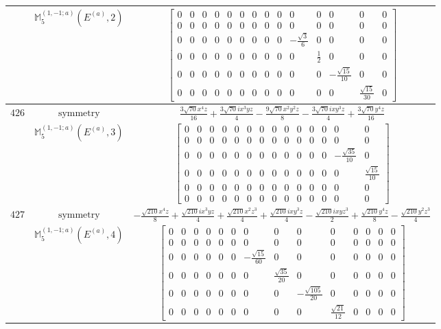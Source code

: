 \documentclass[fleqn,8pt,landscape]{jsarticle}
\begin{document}
\begin{longtable}{ccc}
$  $ & $ \mathbb{M}_{5}^{(1,-1;a)}(E^{(a)},2) $ & $ \begin{bmatrix} 0 & 0 & 0 & 0 & 0 & 0 & 0 & 0 & 0 & 0 & 0 & 0 & 0 & 0 \\ 0 & 0 & 0 & 0 & 0 & 0 & 0 & 0 & 0 & 0 & 0 & 0 & 0 & 0 \\ 0 & 0 & 0 & 0 & 0 & 0 & 0 & 0 & 0 & - \frac{\sqrt{3}}{6} & 0 & 0 & 0 & 0 \\ 0 & 0 & 0 & 0 & 0 & 0 & 0 & 0 & 0 & 0 & \frac{1}{2} & 0 & 0 & 0 \\ 0 & 0 & 0 & 0 & 0 & 0 & 0 & 0 & 0 & 0 & 0 & - \frac{\sqrt{15}}{10} & 0 & 0 \\ 0 & 0 & 0 & 0 & 0 & 0 & 0 & 0 & 0 & 0 & 0 & 0 & \frac{\sqrt{15}}{30} & 0 \end{bmatrix} $ \\ \hline
$ 426 $ & $ \text{symmetry} $ & $ \frac{3 \sqrt{70} x^{4} z}{16} + \frac{3 \sqrt{70} i x^{3} y z}{4} - \frac{9 \sqrt{70} x^{2} y^{2} z}{8} - \frac{3 \sqrt{70} i x y^{3} z}{4} + \frac{3 \sqrt{70} y^{4} z}{16} $ \\
$  $ & $ \mathbb{M}_{5}^{(1,-1;a)}(E^{(a)},3) $ & $ \begin{bmatrix} 0 & 0 & 0 & 0 & 0 & 0 & 0 & 0 & 0 & 0 & 0 & 0 & 0 & 0 \\ 0 & 0 & 0 & 0 & 0 & 0 & 0 & 0 & 0 & 0 & 0 & 0 & 0 & 0 \\ 0 & 0 & 0 & 0 & 0 & 0 & 0 & 0 & 0 & 0 & 0 & 0 & - \frac{\sqrt{35}}{10} & 0 \\ 0 & 0 & 0 & 0 & 0 & 0 & 0 & 0 & 0 & 0 & 0 & 0 & 0 & \frac{\sqrt{15}}{10} \\ 0 & 0 & 0 & 0 & 0 & 0 & 0 & 0 & 0 & 0 & 0 & 0 & 0 & 0 \\ 0 & 0 & 0 & 0 & 0 & 0 & 0 & 0 & 0 & 0 & 0 & 0 & 0 & 0 \end{bmatrix} $ \\ \hline
$ 427 $ & $ \text{symmetry} $ & $ - \frac{\sqrt{210} x^{4} z}{8} + \frac{\sqrt{210} i x^{3} y z}{4} + \frac{\sqrt{210} x^{2} z^{3}}{4} + \frac{\sqrt{210} i x y^{3} z}{4} - \frac{\sqrt{210} i x y z^{3}}{2} + \frac{\sqrt{210} y^{4} z}{8} - \frac{\sqrt{210} y^{2} z^{3}}{4} $ \\
$  $ & $ \mathbb{M}_{5}^{(1,-1;a)}(E^{(a)},4) $ & $ \begin{bmatrix} 0 & 0 & 0 & 0 & 0 & 0 & 0 & 0 & 0 & 0 & 0 & 0 & 0 & 0 \\ 0 & 0 & 0 & 0 & 0 & 0 & 0 & 0 & 0 & 0 & 0 & 0 & 0 & 0 \\ 0 & 0 & 0 & 0 & 0 & 0 & - \frac{\sqrt{15}}{60} & 0 & 0 & 0 & 0 & 0 & 0 & 0 \\ 0 & 0 & 0 & 0 & 0 & 0 & 0 & \frac{\sqrt{35}}{20} & 0 & 0 & 0 & 0 & 0 & 0 \\ 0 & 0 & 0 & 0 & 0 & 0 & 0 & 0 & - \frac{\sqrt{105}}{20} & 0 & 0 & 0 & 0 & 0 \\ 0 & 0 & 0 & 0 & 0 & 0 & 0 & 0 & 0 & \frac{\sqrt{21}}{12} & 0 & 0 & 0 & 0 \end{bmatrix} $ \\ \hline

\end{longtable}
\end{document}
